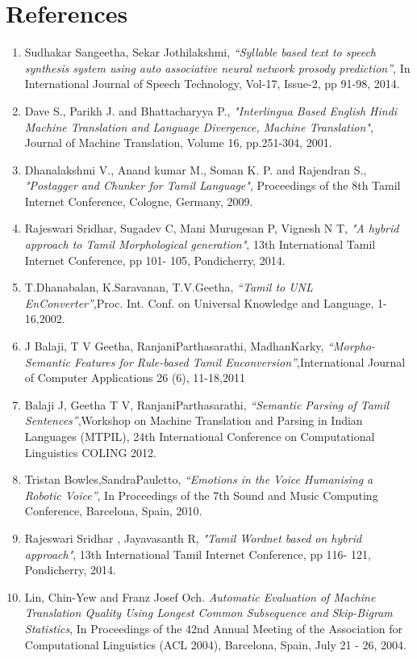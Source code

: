 \documentclass{article}
\begin{document}
\section{References}\large
\begin{enumerate}
\item Sudhakar Sangeetha, Sekar Jothilakshmi,  \textit{“Syllable based  text to speech synthesis system using auto associative neural network prosody prediction”}, In International Journal of Speech Technology, Vol-17, Issue-2, pp 91-98, 2014.

\item Dave S., Parikh J. and Bhattacharyya P., \textit{"Interlingua Based English Hindi Machine Translation and Language Divergence, Machine Translation"}, Journal of Machine Translation, Volume 16, pp.251-304, 2001. 

\item Dhanalakshmi V., Anand kumar M., Soman K. P. and Rajendran S., \textit{"Postagger and Chunker for Tamil Language"}, Proceedings of the 8th Tamil Internet Conference, Cologne, Germany, 2009.

\item Rajeswari Sridhar, Sugadev C, Mani Murugesan P, Vignesh N T,  \textit{"A hybrid approach to Tamil Morphological generation"}, 13th International Tamil Internet Conference, pp 101- 105, Pondicherry, 2014.

\item T.Dhanabalan, K.Saravanan, T.V.Geetha, \textit{“Tamil to UNL EnConverter”},Proc. Int. Conf. on Universal Knowledge and Language, 1-16,2002.


\item J Balaji, T V Geetha, RanjaniParthasarathi,  MadhanKarky, \textit{“Morpho-Semantic Features for Rule-based Tamil Enconversion”},International Journal of Computer Applications 26 (6), 11-18,2011

\item Balaji J, Geetha T V, RanjaniParthasarathi, \textit{“Semantic Parsing of Tamil Sentences”},Workshop on Machine Translation and Parsing in Indian Languages (MTPIL), 24th International Conference on Computational Linguistics COLING 2012.


\item  Tristan Bowles,SandraPauletto,  \textit{“Emotions in the Voice Humanising a Robotic Voice”}, In Proceedings of the 7th Sound and Music Computing Conference, Barcelona, Spain, 2010.

\item Rajeswari Sridhar , Jayavasanth R,  \textit{"Tamil Wordnet based on hybrid approach"}, 13th International Tamil Internet Conference, pp 116- 121, Pondicherry, 2014.

\item Lin, Chin-Yew and Franz Josef Och. \textit{Automatic Evaluation of Machine Translation Quality Using Longest Common Subsequence and Skip-Bigram Statistics}, In Proceedings of the 42nd Annual Meeting of the Association for Computational Linguistics (ACL 2004), Barcelona, Spain, July 21 - 26, 2004.
\end{enumerate}
\end{document}
